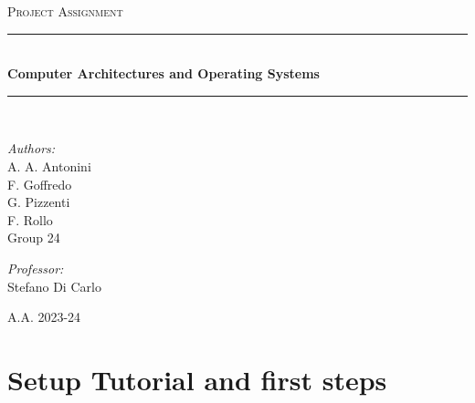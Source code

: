 \documentclass[10pt]{article}
\begin{document}
\begin{center}																	
\newcommand{\HRule}{\rule{\linewidth}{0.5mm}}									
\textsc{\Large Project Assignment}\\[0.5cm]
\vspace*{1cm}																	
\HRule \\[0.4cm]																
{ \huge \bfseries Computer Architectures and Operating Systems }\\[0.4cm]
\HRule \\[5.5cm]																	
 																				
																					
\begin{minipage}{0.4\textwidth}													
\begin{flushleft} \large															
\textit{Authors:}\\
A. A. Antonini\\
F. Goffredo\\
G. Pizzenti \\
F. Rollo \\
Group 24\\
\end{flushleft}																		
\end{minipage}		
																
\begin{minipage}{0.5\textwidth}		
\vspace{-4.5cm}											
\begin{flushright} \large															
\textit{Professor:} \\
Stefano Di Carlo																						
\end{flushright}																	
\end{minipage}	
\vspace*{1cm}

\vspace{2cm} 																				
\begin{center}																					
{\large A.A. 2023-24}																	
 			\end{center}												  						
\end{center}							 											
												 											
																					
\newpage																		

\tableofcontents 

\newpage
\part{Setup Tutorial and first steps}
\end{document}
